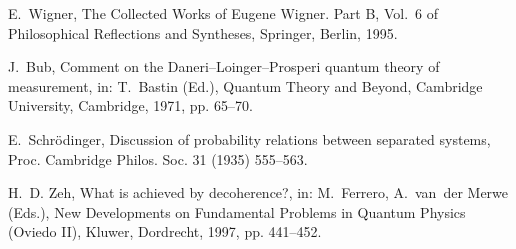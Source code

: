 \documentclass[3p,sort&compress]{elsarticle}
\begin{document}
\begin{thebibliography}{100}
E.~Wigner, The Collected Works of Eugene Wigner. Part B, Vol.~6 of
  Philosophical Reflections and Syntheses, Springer, Berlin, 1995.

J.~Bub, Comment on the {D}aneri--{L}oinger--{P}rosperi quantum theory of
  measurement, in: T.~Bastin (Ed.), Quantum Theory and Beyond, Cambridge
  University, Cambridge, 1971, pp. 65--70.

E.~Schr{\"o}dinger, Discussion of probability relations between separated
  systems, Proc. Cambridge Philos. Soc. 31 (1935) 555--563.

H.~D. Zeh, What is achieved by decoherence?, in: M.~Ferrero, A.~van~der Merwe
  (Eds.), New Developments on Fundamental Problems in Quantum Physics (Oviedo
  II), Kluwer, Dordrecht, 1997, pp. 441--452.

\end{thebibliography}
\end{document}
